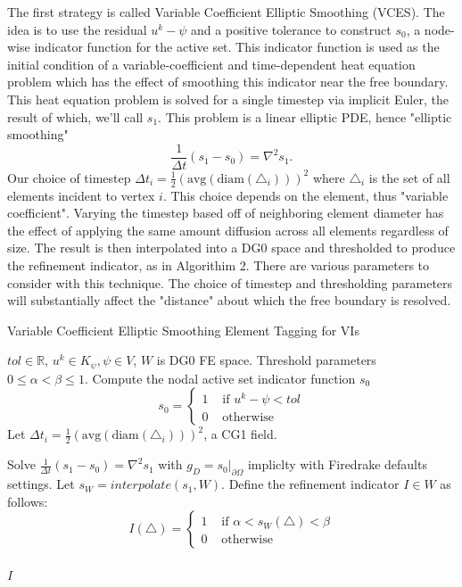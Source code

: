 \documentclass[]{interact}
\theoremstyle{plain}%
\theoremstyle{definition}
\theoremstyle{remark}
\begin{document}
The first strategy is called Variable Coefficient Elliptic Smoothing (VCES). The idea is to use the residual $u^k - \psi$ and a positive tolerance to construct $s_0$, a node-wise indicator function for the active set. This indicator function is used as the initial condition of a variable-coefficient and time-dependent heat equation problem which has the effect of smoothing this indicator near the free boundary. This heat equation problem is solved for a single timestep via implicit Euler, the result of which, we'll call $s_1$. This problem is a linear elliptic PDE, hence "elliptic smoothing"
\begin{equation}
  \frac{1}{\Delta t}(s_1 - s_0) = \nabla^2 s_1.
\end{equation}
Our choice of timestep $\Delta t_i = \frac{1}{2}(\text{avg}(\text{diam}(\triangle_i)))^2$ where $\triangle_i$ is the set of all elements incident to vertex $i$. This choice depends on the element, thus "variable coefficient". Varying the timestep based off of neighboring element diameter has the effect of applying the same amount diffusion across all elements regardless of size. The result is then interpolated into a DG0 space and thresholded to produce the refinement indicator, as in Algorithim 2. There are various parameters to consider with this technique. The choice of timestep and thresholding parameters will substantially affect the "distance" about which the free boundary is resolved. 

\begin{algorithm}[H]
	\caption{Variable Coefficient Elliptic Smoothing Element Tagging for VIs}\label{alg:cap}
	\begin{algorithmic}[1]
		\Require $tol \in \mathbb{R}$, $u^k \in K_\psi, \psi \in V$, $W$ is DG0 FE space.
		\Require Threshold parameters $0\leq \alpha < \beta \leq 1$.
		\State Compute the nodal active set indicator function $s_0$
		  \begin{equation*}
			s_0 = \begin{cases}
			  1 & \text{ if } u^k - \psi < tol\\
			  0 & \text{ otherwise}
			\end{cases}
		  \end{equation*}
		\State Let $\Delta t_i = \frac{1}{2}(\text{avg}(\text{diam}(\triangle_i)))^2$, a CG1 field.
	  
		\State Solve $\frac{1}{\Delta t}(s_1 - s_0) = \nabla^2 s_1$ with $g_D = s_0|_{\partial\Omega}$ impliclty with Firedrake defaults settings. 
		\State Let $s_W = interpolate(s_1, W)$.
		\State Define the refinement indicator $I \in W$ as follows:
		\begin{equation*}
		  I(\triangle) = \begin{cases}
			1 & \text{ if } \alpha < s_W(\triangle) < \beta\\
			0 & \text{ otherwise}
		  \end{cases}
		\end{equation*}\\
		\Return $I$
	\end{algorithmic}
	\end{algorithm}
\end{document}
